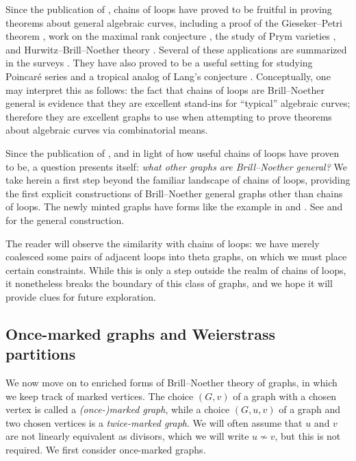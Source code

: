 \documentclass[11pt]{article}
\theoremstyle{definition}
\numberwithin{equation}{section}
\begin{document}
Since the publication of \cite{CDPR12}, chains of loops have proved to be fruitful in proving theorems about general algebraic curves, including a proof of the Gieseker--Petri theorem \cite{JensenPayneTP1}, work on the maximal rank conjecture \cite{JensenPayneTP2}, the study of Prym varieties \cite{CLRW,LenUlirsch}, and Hurwitz--Brill--Noether theory \cite{PflKGonal, JensenRanganathan, CookPowellJensen}. Several of these applications are summarized in the surveys \cite{jensenNotices, jensen2021recent}. They have also proved to be a useful setting for studying Poincar\'e series and a tropical analog of Lang's conjecture \cite{manjunath2020poincar}. Conceptually, one may interpret this as follows: the fact that chains of loops are Brill--Noether general is evidence that they are excellent stand-ins for ``typical'' algebraic curves; therefore they are excellent graphs to use when attempting to prove theorems about algebraic curves via combinatorial means.

Since the publication of \cite{CDPR12}, and in light of how useful chains of loops have proven to be, a question presents itself: \emph{what other graphs are Brill--Noether general?} 
We take herein a first step beyond the familiar landscape of chains of loops, providing the first explicit constructions of Brill--Noether general graphs other than chains of loops. The newly minted graphs have forms like the example in  and . See  and  for the general construction.

The reader will observe the similarity with chains of loops: we have merely coalesced some pairs of adjacent loops into theta graphs, on which we must place certain constraints. While this is only a step outside the realm of chains of loops, it nonetheless breaks the boundary of this class of graphs, and we hope it will provide clues for future exploration.

\subsection{Once-marked graphs and Weierstrass partitions}


We now move on to enriched forms of Brill--Noether theory of graphs, in which we keep track of marked vertices.
The choice $(G,v)$ of a graph with a chosen vertex is called a \emph{(once-)marked graph}, while a choice $(G,u,v)$ of a graph and two chosen vertices is a \emph{twice-marked graph}. We will often assume that $u$ and $v$ are not linearly equivalent as divisors, which we will write $u \not\sim v$, but this is not required.  We first consider once-marked graphs.
\end{document}
